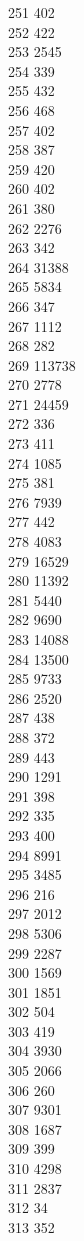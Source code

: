 { 251	402 \\
 252	422 \\
 253	2545 \\
 254	339 \\
 255	432 \\
 256	468 \\
 257	402 \\
 258	387 \\
 259	420 \\
 260	402 \\
 261	380 \\
 262	2276 \\
 263	342 \\
 264	31388 \\
 265	5834 \\
 266	347 \\
 267	1112 \\
 268	282 \\
 269	113738 \\
 270	2778 \\
 271	24459 \\
 272	336 \\
 273	411 \\
 274	1085 \\
 275	381 \\
 276	7939 \\
 277	442 \\
 278	4083 \\
 279	16529 \\
 280	11392 \\
 281	5440 \\
 282	9690 \\
 283	14088 \\
 284	13500 \\
 285	9733 \\
 286	2520 \\
 287	438 \\
 288	372 \\
 289	443 \\
 290	1291 \\
 291	398 \\
 292	335 \\
 293	400 \\
 294	8991 \\
 295	3485 \\
 296	216 \\
 297	2012 \\
 298	5306 \\
 299	2287 \\
 300	1569 \\
 301	1851 \\
 302	504 \\
 303	419 \\
 304	3930 \\
 305	2066 \\
 306	260 \\
 307	9301 \\
 308	1687 \\
 309	399 \\
 310	4298 \\
 311	2837 \\
 312	34 \\
 313	352 \\
}
